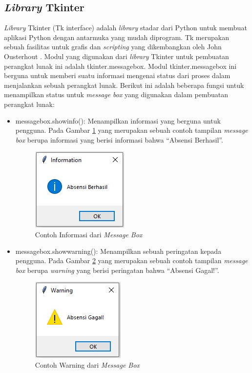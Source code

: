 \subsection{\textit{Library} Tkinter}
\textit{Library} Tkinter (Tk interface) adalah \textit{library} stadar dari Python untuk membuat aplikasi Python dengan antarmuka yang mudah diprogram. Tk merupakan sebuah fasilitas untuk grafis dan \textit{scripting} yang dikembangkan oleh John Ousterhout {\cite{tkinter}}. Modul yang digunakan dari \textit{library} Tkinter untuk pembuatan perangkat lunak ini adalah tkinter.messagebox. Modul tkinter.messagebox ini berguna untuk memberi suatu informasi mengenai status dari proses dalam menjalankan sebuah perangkat lunak. Berikut ini adalah beberapa fungsi untuk menampilkan status untuk \textit{message box} yang digunakan dalam pembuatan perangkat lunak:
\begin{itemize}
	\item messagebox.showinfo(): Menampilkan informasi yang berguna untuk pengguna. Pada Gambar \ref{fig:infoBox} yang merupakan sebuah contoh tampilan \textit{message box} berupa informasi yang berisi informasi bahwa ``Absensi Berhasil''. 
	\begin{figure}[H]
		\centering
		\includegraphics[scale=0.9]{Gambar/infoBox.jpg}
		\caption{Contoh Informasi dari \textit{Message Box}} 
		\label{fig:infoBox}
	\end{figure}
	\item messagebox.showwarning(): Menampilkan sebuah peringatan kepada pengguna.  Pada Gambar \ref{fig:warningBox} yang merupakan sebuah contoh tampilan \textit{message box} berupa \textit{warning} yang berisi peringatan bahwa ``Absensi Gagal!''. 
	\begin{figure}[H]
		\centering
		\includegraphics[scale=0.9]{Gambar/warningBox.jpg}
		\caption{Contoh Warning dari \textit{Message Box}} 
		\label{fig:warningBox}
	\end{figure}
\end{itemize}

